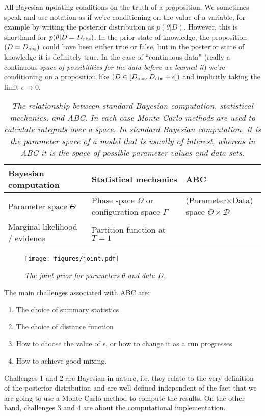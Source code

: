 \documentclass[a4paper, 12pt]{article}
\newcommand{\params}{\theta}
\newcommand{\data}{D}
\newcommand{\dobs}{D_{\rm obs}}
\begin{document}
All Bayesian updating conditions on the truth of a proposition. We sometimes
speak and use notation as if we're conditioning on the value of a variable, for
example by writing the posterior distribution as $p(\params | \data)$. However,
this is shorthand for $p(\params | \data = \dobs)$. In the prior state of
knowledge, the proposition $(\data = \dobs)$ could have been either true or
false, but in the posterior state of knowledge it is definitely true.
In the case of ``continuous data'' (really a continuous {\it space of
possibilities for the data before we learned it}) we're conditioning on a
proposition like $(\data \in [\dobs, \dobs+\epsilon])$ and implicitly
taking the limit $\epsilon \to 0$.

\begin{table}[ht!]
\centering
\small
\begin{tabular}{lll}
\hline
Bayesian computation		&		Statistical mechanics		&		ABC\\
\hline
Parameter space	$\Theta$	&		Phase space	$\Omega$ or configuration space $\Gamma$ 			& (Parameter$\times$Data) space $\Theta \times \mathcal{D}$\\		
Marginal likelihood / evidence	&	Partition function at $T=1$	&\\


\end{tabular}
\caption{\it The relationship between standard Bayesian computation, statistical
mechanics, and ABC. In each case Monte Carlo methods are used to calculate
integrals over a space. In standard Bayesian computation, it is the parameter
space of a model that is usually of interest, whereas in ABC it is the space
of possible parameter values {\it and} data sets.
\label{tab:relation}}
\end{table}


\begin{figure}[ht!]
\centering
\texttt{[image: figures/joint.pdf]}
\caption{\it The joint prior for parameters $\params$ and data $\data$.
\label{fig:joint}}
\end{figure}

The main challenges associated with ABC are:
\begin{enumerate}
\item The choice of summary statistics
\item The choice of distance function
\item How to choose the value of $\epsilon$, or how to change it as a run
progresses
\item How to achieve good mixing.
\end{enumerate}
Challenges 1 and 2 are Bayesian in nature, i.e. they relate to the very
definition of the posterior distribution and are well defined independent of
the fact that we are going to use a Monte Carlo method to compute the
results. On the other hand, challenges 3 and 4 are about the computational implementation.
\end{document}
